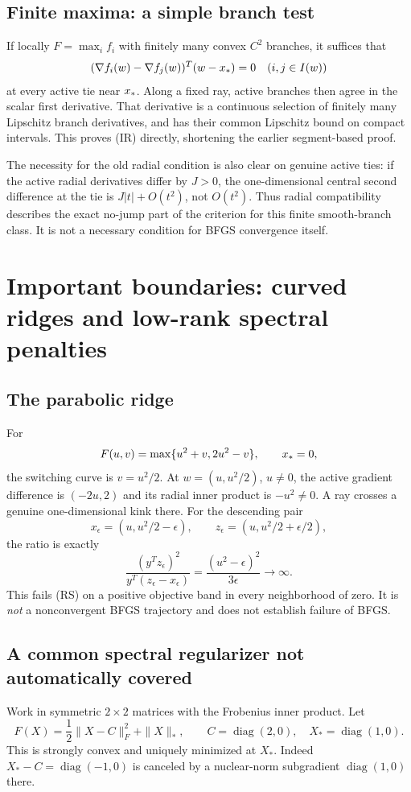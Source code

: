 \documentclass[10pt,oneside,openany]{book}
\theoremstyle{remark}\newtheorem{remark}{Remark}[chapter]
\begin{document}
\subsection{Finite maxima: a simple branch test}
If locally $F=\max_i f_i$ with finitely many convex $C^2$ branches, it suffices that
\[
 (\nabla f_i(w)-\nabla f_j(w))^T(w-x_*)=0
 \quad(i,j\in I(w))
\]
at every active tie near $x_*$. Along a fixed ray, active branches then agree in the scalar first derivative. That derivative is a continuous selection of finitely many Lipschitz branch derivatives, and has their common Lipschitz bound on compact intervals. This proves (IR) directly, shortening the earlier segment-based proof.

The necessity for the old radial condition is also clear on genuine active ties: if the active radial derivatives differ by $J>0$, the one-dimensional central second difference at the tie is $J|t|+O(t^2)$, not $O(t^2)$. Thus radial compatibility describes the exact no-jump part of the criterion for this finite smooth-branch class. It is not a necessary condition for BFGS convergence itself.


\setcounter{section}{6}
\setcounter{theorem}{0}
\setcounter{equation}{8}
\section{Important boundaries: curved ridges and low-rank spectral penalties}
\subsection{The parabolic ridge}
For
\[
 F(u,v)=\max\{u^2+v,2u^2-v\},\qquad x_*=0,
\]
the switching curve is $v=u^2/2$. At $w=(u,u^2/2)$, $u\ne0$, the active gradient difference is $(-2u,2)$ and its radial inner product is $-u^2\ne0$. A ray crosses a genuine one-dimensional kink there. For the descending pair
\[
 x_\epsilon=(u,u^2/2-\epsilon),\qquad
 z_\epsilon=(u,u^2/2+\epsilon/2),
\]
the ratio is exactly
\[
 \frac{(y^Tz_\epsilon)^2}{y^T(z_\epsilon-x_\epsilon)}
 =\frac{(u^2-\epsilon)^2}{3\epsilon}\to\infty.
\]
This fails (RS) on a positive objective band in every neighborhood of zero. It is \emph{not} a nonconvergent BFGS trajectory and does not establish failure of BFGS.

\subsection{A common spectral regularizer not automatically covered}
Work in symmetric $2\times2$ matrices with the Frobenius inner product. Let
\[
 F(X)=\frac12\|X-C\|_F^2+\|X\|_*,\qquad
 C=\operatorname{diag}(2,0),\quad X_*=\operatorname{diag}(1,0).
\]
This is strongly convex and uniquely minimized at $X_*$. Indeed $X_*-C=\operatorname{diag}(-1,0)$ is canceled by a nuclear-norm subgradient $\operatorname{diag}(1,0)$ there.
\end{document}

